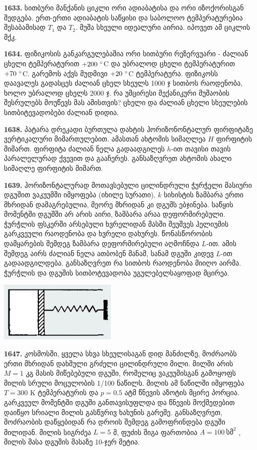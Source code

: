 \documentclass[12pt,a4paper,]{report}
\begin{document}
\textbf{1633.} სითბური მანქანის ციკლი ორი ადიაბატისა და ორი იზოქორისგან შედგება. ერთ-ერთი ადიაბატის საწყისი და საბოლოო ტემპერატურებია შესაბამისად $T_1$ და $T_2$. მუშა სხეული იდეალური აირია. იპოვეთ ამ ციკლის მქკ.   

\textbf{1634.} ფიზიკოსის განკარგულებაშია ორი სითბური რეზერვუარი - ძალიან ცხელი ტემპერატურით $+200\ \degree$C და უბრალოდ ცხელი ტემპერატურით $+70\ \degree$C. გარემოს აქვს მუდმივი $+20\ \degree$C ტემპერატურა. ფიზიკოსს დაავალეს გადასცეს ძალიან ცხელ სხეულს 1000 ჯ სითბოს რაოდენობა, ხოლო უბრალოდ ცხელს 2000 ჯ. რა უმცირესი მექანიკური მუშაობის შესრულებს მოუწევს მას ამისთვის? ცხელი და ძალიან ცხელი სხეულების სითბიტევადობები ძალიან დიდია.

\textbf{1638.} პატარა დრეკადი ბურთულა დახტის ჰორიზონონტალურ ფირფიტაზე ვერტიკალური მიმართულებით. ამასთან ახტომის სიმაღლეა $H$ ფირფიტის მიმართ. ფირფიტა ძალიან ნელა გადაადგილეს  $h$-ით თავისი თავის პარალელურად ქვევით და გააჩერეს. განსაზღვრეთ ახტომის ახალი სიმაღლე ფირფიტის მიმართ. 

\textbf{1639.} ჰორიზონტალურად მოთავსებული ცილინდრული ჭურჭელი მასიური დგუშით ვაკუუმში იმყოფება (იხილე სურათი). $k$ სიხისტის ზამბარა ერთი მხრიდან დამაგრებულია, მეორე მხრიდან კი დგუშს ებჯინება. საწყის მომენტში დგუშში არ არის აირი, ზამბარა არაა დეფორმირებული. ჭურჭლის ფსკერში არსებული ხვრელიდან მასში შეუშვეს ჰელიუმის გარკვეული რაოდენობა და ხვრელი დახურეს. წონასწორობის დამყარების შემდეგ ზამბარა დეფორმირებული აღმოჩნდა $L$-ით. ამის შემდეგ აირს ძალიან ნელა ათბობენ მანამ, სანამ დგუში კიდევ $L$-ით გადაადგილდება. განსაზღვრეთ რა სითბოს რაოდენობა მიიღო აირმა. ჭურჭლის და დგუშის სითბოტევადობა უგულებელსაყოფად მცირეა.
		\begin{center}
			\includegraphics[scale=0.5]{images/F1639}
		\end{center}

\textbf{1647.} კოსმოსში, ყველა სხვა სხეულისაგან დიდ მანძილზე, მოძრაობს ერთი მხრიდან დახშული გრძელი ცილინდრული მილი. მილში არის $M=1$ კგ მასის მიწებებული დგუში, რომელიც ვაკუუმისგან გამოყოფს მილის სრული მოცულობის 1/100 ნაწილს. მილის ამ ნაწილში იმყოფება $T=300$ K ტემპერატურის და $p=0.5$ ატმ წნევის აზოტის მცირე პორცია. გარკვეულ მომენტში დგუში განთავისუფლდა და წნევის მოქმედებით დაიწყო სრიალი მილის გასწვრივ ხახუნის გარეშე. განსაზღვრეთ, მოძრაობის დაწყებიდან რა დროის შემდეგ გამოფრინდება დგუში მილიდან. მილის სიგრძეა $L=5$ მ, ფუძის შიგა ფართობია $A=100\ \text{სმ}^2$ , მილის მასა დგუშის მასაზე 10-ჯერ მეტია.
\end{document}
